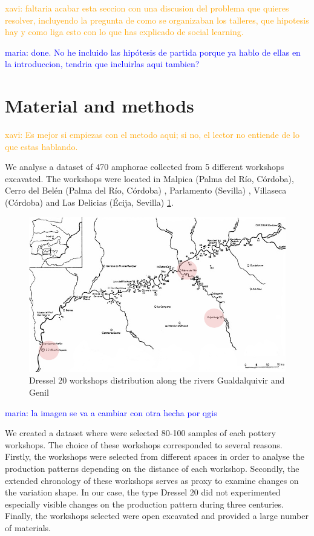 \documentclass[review]{elsarticle}
\newcommand{\memo}[2]{\textcolor{#1}{#2}}
\newcommand{\xavi}[1]{\memo{orange}{xavi: #1\\}}
\newcommand{\maria}[1]{\memo{blue}{maria: #1\\}}
\begin{document}
\xavi{faltaria acabar esta seccion con una discusion del problema que quieres resolver, incluyendo la pregunta de como se organizaban los talleres, que hipotesis hay y como liga esto con lo que has explicado de social learning.}

\maria{done. No he incluido las hipótesis de partida porque ya hablo de ellas en la introduccion, tendria que incluirlas aqui tambien?}

\section{Material and methods}

\xavi{Es mejor si empiezas con el metodo aqui; si no, el lector no entiende de lo que estas hablando.}

We analyse a dataset of 470 amphorae collected from 5 different workshops excavated. The workshops were located in Malpica (Palma del R\'io, C\'ordoba), Cerro del Bel\'en (Palma del R\'io, C\'ordoba) \citep{diaz_trujillo_excavacion_1992}, Parlamento (Sevilla) \citep{garcia_vargas_anforas_2000}, Villaseca (C\'ordoba)\citep{garcia_vargas_enrique_excavacion_????} and Las Delicias (\'Ecija, Sevilla) \citep{fernandez_excavacion_2001,_atelier_2014} \ref{romanworkshop}. 


\begin{figure}[htp]
	\centering
\includegraphics[scale=0.30]{romanworkshop.png}
\caption{Dressel 20 workshops distribution along the rivers Gualdalquivir and Genil}
\label{romanworkshop}
\end{figure} 

\maria{la imagen se va a  cambiar con otra hecha por qgis}


We created a dataset where were selected 80-100 samples of each pottery workshops. The choice of these workshops corresponded to several reasons. Firstly, the workshops were selected from different spaces in order to analyse the production patterns depending on the distance of each workshop. Secondly, the extended chronology of these workshops serves as proxy to examine changes on the variation shape. In our case, the type Dressel 20 did not experimented especially visible changes on the production pattern during three centuries.%
Finally, the workshops selected were open excavated and provided a large number of materials.   
\end{document}
